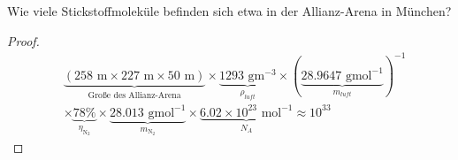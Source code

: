 \begin{Problem}
	Wie viele Stickstoffmolek\"{u}le befinden sich etwa in der Allianz-Arena in M\"{u}nchen?
\end{Problem}
\begin{proof}
	\begin{align*}
	&	\underbrace{(258\text{ m}\times 227\text{ m}\times 50\text{ m})}_\text{Große des Allianz-Arena}\times \underbrace{1293\text{ gm}^{-3}}_{\rho_{luft}}\times \left( \underbrace{28.9647\text{ gmol}^{-1}}_{m_{luft}} \right)^{-1}\\&\times \underbrace{78\%}_{\eta_{\text{N}_2}}\times \underbrace{28.013\text{ gmol}^{-1}}_{m_{\text{N}_2}}\times \underbrace{6.02\times 10^{23}\text{ mol}^{-1}}_{N_A}\approx 10^33
	\end{align*}
\end{proof}
